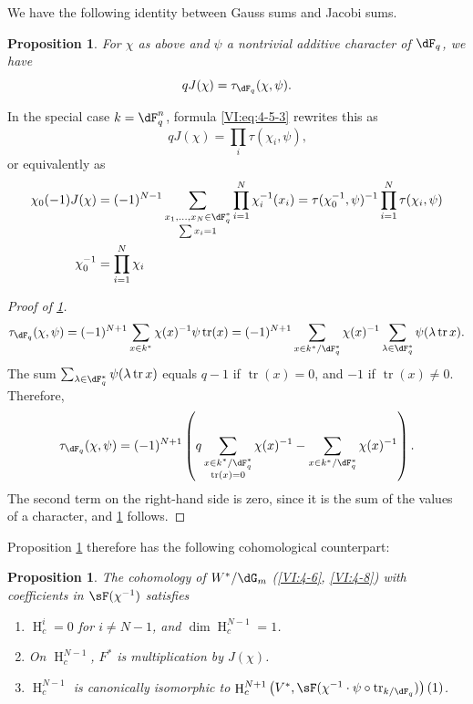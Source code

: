 \documentclass[oneside]{book}
\DeclareMathOperator{\h}{H}
\DeclareMathOperator{\tr}{tr}
\newcounter{char}
\theoremstyle{sga-source}
\theoremstyle{sga-source-dash}
\theoremstyle{sga-source-dotdash}
\theoremstyle{sga-source-number-note-dash}
\theoremstyle{sga-source-note-number-dotdash}
\theoremstyle{sga-source-example-dotdash}
\theoremstyle{sga-source-inline-number}
\theoremstyle{sga-source-bare-number}
\theoremstyle{sga-source}
\newtheorem{proposition_}[subsection]{Proposition}
\newcommand{\PrintPage}[1]{}\newcommand{\MathPage}[1]{}\newcommand{\PrintCite}[2]{#1}\newcommand{\var}[3]{#2}
\begin{document}
We have the following identity between Gauss sums and Jacobi sums. 





\PrintPage{204}
\begin{proposition_}\label{VI:4-15}
For $\chi$ as above and $\psi$ a nontrivial additive character of 
$\dF_q$, we have 
\[
  q J(\chi) = \tau_{\dF_q}(\chi,\psi) \text{.} 
\]
\end{proposition_}

In the special case $k=\dF_q^n$, formula \eqref{VI:eq:4-5-3} rewrites this as 
\begin{equation*}\tag{4.15.1}\label{VI:eq:4-15-1}
  q J(\chi) = \prod_i \tau(\chi_i,\psi) \text{,} 
\end{equation*}
or equivalently as 
\begin{align*}
  \chi_0(-1) J(\chi) &= (-1)^{N-1} \sum_{\substack{x_1,\dots,x_N\in \dF_q^\ast \\ \sum x_i = 1}} \prod_{i=1}^N \chi_i^{-1}(x_i) = \tau(\chi_0^{-1},\psi)^{-1} \prod_{i=1}^N \tau(\chi_i,\psi) \\
  \chi_0^{-1} &= \prod_{i=1}^N \chi_i 
\end{align*}





\begin{proof}[Proof of \ref{VI:4-15}]
\[
  \tau_{\dF_q}(\chi,\psi) = (-1)^{N+1} \sum_{x\in k^\ast} \chi(x)^{-1} \psi \tr(x) = (-1)^{N+1} \sum_{x\in k^\ast/\dF_q^\ast} \chi(x)^{-1} \sum_{\lambda\in \dF_q^\ast} \psi(\lambda \tr x) \text{.}
\]
The sum $\sum_{\lambda\in \dF_q^\ast} \psi(\lambda \tr x)$ equals $q-1$ if 
$\tr(x)=0$, and $-1$ if $\tr(x)\ne 0$. Therefore, 
\[
  \tau_{\dF_q}(\chi,\psi) = (-1)^{N+1} \left(\var{q\sum_{x\in k^\ast/\dF_q^\ast} \chi(x)^{-1}}{q\sum_{\substack{x\in k^\ast/\dF_q^\ast\\\tr(x)=0}} \chi(x)^{-1}}{S45-SOL-0843} - \sum_{x\in k^\ast/\dF_q^\ast} \chi(x)^{-1}\right) \text{.}
\]
The second term on the right-hand side is zero, since it is the sum of the values 
of a character, and \ref{VI:4-15} follows. 
\end{proof}

Proposition \ref{VI:4-15} therefore has the following cohomological counterpart: 





\begin{proposition_}\label{VI:4-16}
The cohomology of $W^\ast/\dG_m$ (\ref{VI:4-6}, \ref{VI:4-8}) with coefficients 
in $\sF(\chi^{-1})$ satisfies 
\begin{enumerate}[\indent (i)]
  \item $\h_c^i=0$ for $i\ne N-1$, and $\dim \h_c^{N-1}{}=1$. 
  \item On $\h_c^{N-1}$, $F^\ast$ is multiplication by $J(\chi)$. 
  \item $\h_c^{N-1}$ is canonically isomorphic to 
    $\h_c^{N+1}\left(V^\ast,\sF(\chi^{-1}\cdot \psi\circ \tr_{k/\dF_q})\right)(1)$. 
\end{enumerate}
\end{proposition_}
\end{document}
